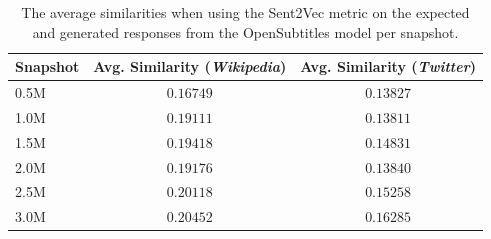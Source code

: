 \begin{table}[H]
	\centering
	\begin{adjustbox}{max width=\textwidth}
		\begin{tabular}{lcc}
			\toprule
			Snapshot & Avg. Similarity (\emph{Wikipedia}) & Avg. Similarity (\emph{Twitter})\\
			\midrule
			0.5M & $0.16749$ & $0.13827$\\
			1.0M & $0.19111$ & $0.13811$\\
			1.5M & $0.19418$ & $0.14831$\\
			2.0M & $0.19176$ & $0.13840$\\
			2.5M & $0.20118$ & $0.15258$\\
			3.0M & $0.20452$ & $0.16285$\\
			\bottomrule
		\end{tabular}
	\end{adjustbox}
	\caption{The average similarities when using the Sent2Vec metric on the expected and generated responses from the OpenSubtitles model per snapshot.}
	\label{results:sent2vec:opensubtitles:results_table}
\end{table}

